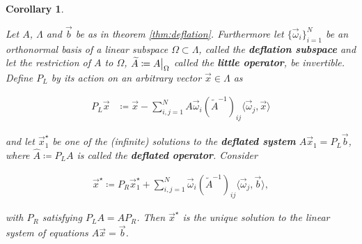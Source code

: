 \documentclass{article}
\newcommand\restr[2]{{%
  \left.\kern-\nulldelimiterspace %
  #1 %
  \vphantom{\big|} %
  \right|_{#2} %
  }
}
\theoremstyle{plain} %
\newtheorem{corollary}[theorem]{Corollary}
\theoremstyle{convention} %
\theoremstyle{remark} %
\def\df#1{\textbf{\textit{#1}}}
\numberwithin{equation}{section}
\begin{document}
\begin{corollary}

\label{cor:deflation}

Let $A$, $\Lambda$ and $\vec{b}$ be as in theorem \ref{thm:deflation}. Furthermore let $\{ \vec{\omega}_i \}_{i=1}^N$ be an orthonormal basis of a linear subspace $\Omega \subset \Lambda$, called the \df{deflation subspace} and let the restriction of $A$ to $\Omega$, $\widetilde{A} \coloneqq \restr{A}{\Omega}$ called the \df{little operator}, be invertible. Define $P_L$ by its action on an arbitrary vector $\vec{x} \in \Lambda$ as

\begin{align*}
    P_L \vec{x} &\coloneqq \vec{x} - \sum_{i,j=1}^N A \vec{\omega}_i (\widetilde{A}^{-1})_{ij} \langle \vec{\omega}_j, \vec{x} \rangle
\end{align*}

and let $\vec{x}^{\star}_1$ be one of the (infinite) solutions to the \df{deflated system} $\hat{A} \vec{x}_1 = P_L \vec{b}$, where $\hat{A} \coloneqq P_L A$ is called the \df{deflated operator}. Consider

\begin{align}
    \vec{x}^{\star} \coloneqq P_R \vec{x}^{\star}_1 + \sum_{i,j=1}^N \vec{\omega}_i (\widetilde{A}^{-1})_{ij} \langle \vec{\omega}_j, \vec{b} \rangle, \label{eq:defl_soln}
\end{align}

with $P_R$ satisfying $P_L A = A P_R$. Then $\vec{x}^{\star}$ is the unique solution to the linear system of equations $A \vec{x} = \vec{b}$.

\end{corollary}
\end{document}
